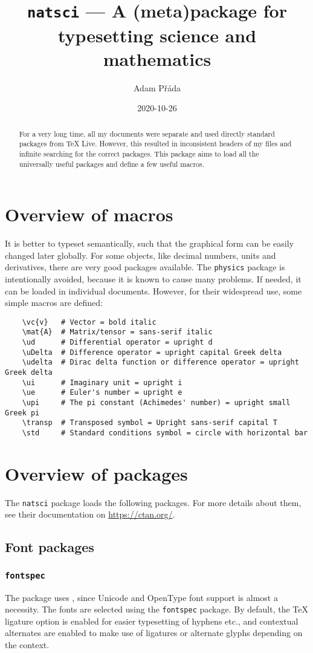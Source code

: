 \documentclass{article}
\title{\texttt{natsci} --- A (meta)package for typesetting science and mathematics}
\author{Adam Přáda}
\date{2020-10-26}
\begin{document}
\maketitle
\begin{abstract}
    \noindent
    For a very long time, all my documents were separate and used directly standard packages from \TeX{} Live. However, this resulted in inconsistent headers of my files and infinite searching for the correct packages. This package aims to load all the universally useful packages and define a few useful macros.
\end{abstract}
\section{Overview of macros}
It is better to typeset semantically, such that the graphical form can be easily changed later globally. For some objects, like decimal numbers, units and derivatives, there are very good packages available. The \texttt{physics} package is intentionally avoided, because it is known to cause many problems. If needed, it can be loaded in individual documents. However, for their widespread use, some simple macros are defined:
\begin{verbatim}
    \vc{v}   # Vector = bold italic
    \mat{A}  # Matrix/tensor = sans-serif italic
    \ud      # Differential operator = upright d
    \uDelta  # Difference operator = upright capital Greek delta
    \udelta  # Dirac delta function or difference operator = upright Greek delta
    \ui      # Imaginary unit = upright i
    \ue      # Euler's number = upright e
    \upi     # The pi constant (Achimedes' number) = upright small Greek pi
    \transp  # Transposed symbol = Upright sans-serif capital T
    \std     # Standard conditions symbol = circle with horizontal bar
\end{verbatim}
\newpage
\section{Overview of packages}
The \texttt{natsci} package loads the following packages. For more details about them, see their documentation on \url{https://ctan.org/}.
\subsection{Font packages}
\subsubsection{\texttt{fontspec}}
The package uses , since Unicode and OpenType font support is almost a necessity. The fonts are selected using the \texttt{fontspec} package. By default, the \TeX{} ligature option is enabled for easier typesetting of hyphens etc., and contextual alternates are enabled to make use of ligatures or alternate glyphs depending on the context.
\end{document}
